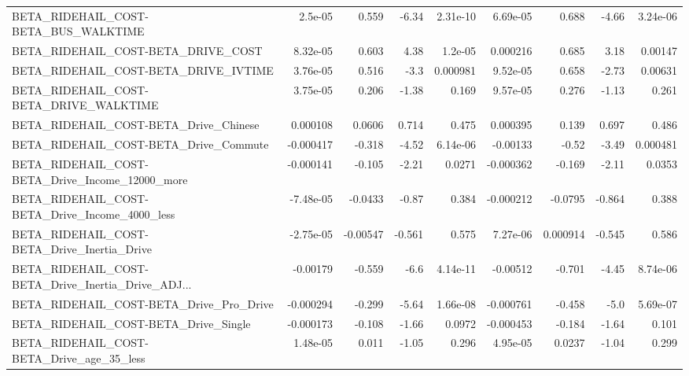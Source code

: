 \begin{tabular}{lrrrrrrrr}
BETA\_RIDEHAIL\_COST-BETA\_BUS\_WALKTIME               &     2.5e-05 &        0.559 &    -6.34 & 2.31e-10 &   6.69e-05 &       0.688 &        -4.66 &      3.24e-06 \\
BETA\_RIDEHAIL\_COST-BETA\_DRIVE\_COST                 &    8.32e-05 &        0.603 &     4.38 &  1.2e-05 &   0.000216 &       0.685 &         3.18 &       0.00147 \\
BETA\_RIDEHAIL\_COST-BETA\_DRIVE\_IVTIME               &    3.76e-05 &        0.516 &     -3.3 & 0.000981 &   9.52e-05 &       0.658 &        -2.73 &       0.00631 \\
BETA\_RIDEHAIL\_COST-BETA\_DRIVE\_WALKTIME             &    3.75e-05 &        0.206 &    -1.38 &    0.169 &   9.57e-05 &       0.276 &        -1.13 &         0.261 \\
BETA\_RIDEHAIL\_COST-BETA\_Drive\_Chinese              &    0.000108 &       0.0606 &    0.714 &    0.475 &   0.000395 &       0.139 &        0.697 &         0.486 \\
BETA\_RIDEHAIL\_COST-BETA\_Drive\_Commute              &   -0.000417 &       -0.318 &    -4.52 & 6.14e-06 &   -0.00133 &       -0.52 &        -3.49 &      0.000481 \\
BETA\_RIDEHAIL\_COST-BETA\_Drive\_Income\_12000\_more    &   -0.000141 &       -0.105 &    -2.21 &   0.0271 &  -0.000362 &      -0.169 &        -2.11 &        0.0353 \\
BETA\_RIDEHAIL\_COST-BETA\_Drive\_Income\_4000\_less     &   -7.48e-05 &      -0.0433 &    -0.87 &    0.384 &  -0.000212 &     -0.0795 &       -0.864 &         0.388 \\
BETA\_RIDEHAIL\_COST-BETA\_Drive\_Inertia\_Drive        &   -2.75e-05 &     -0.00547 &   -0.561 &    0.575 &   7.27e-06 &    0.000914 &       -0.545 &         0.586 \\
BETA\_RIDEHAIL\_COST-BETA\_Drive\_Inertia\_Drive\_ADJ... &    -0.00179 &       -0.559 &     -6.6 & 4.14e-11 &   -0.00512 &      -0.701 &        -4.45 &      8.74e-06 \\
BETA\_RIDEHAIL\_COST-BETA\_Drive\_Pro\_Drive            &   -0.000294 &       -0.299 &    -5.64 & 1.66e-08 &  -0.000761 &      -0.458 &         -5.0 &      5.69e-07 \\
BETA\_RIDEHAIL\_COST-BETA\_Drive\_Single               &   -0.000173 &       -0.108 &    -1.66 &   0.0972 &  -0.000453 &      -0.184 &        -1.64 &         0.101 \\
BETA\_RIDEHAIL\_COST-BETA\_Drive\_age\_35\_less          &    1.48e-05 &        0.011 &    -1.05 &    0.296 &   4.95e-05 &      0.0237 &        -1.04 &         0.299 \\

\end{tabular}

